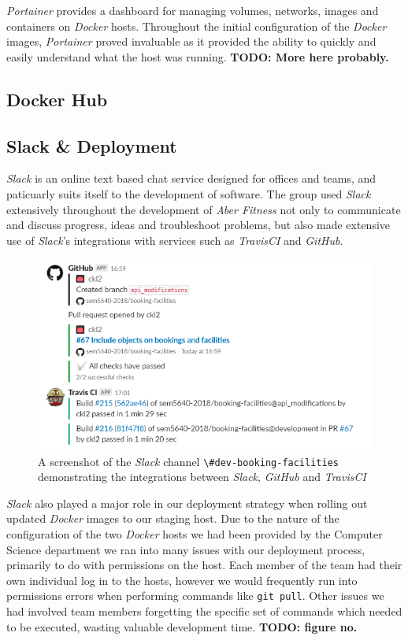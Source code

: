 \textit{Portainer} provides a dashboard for managing volumes, networks, images and containers on \textit{Docker} hosts. Throughout the initial configuration of the \textit{Docker} images, \textit{Portainer} proved invaluable as it provided the ability to quickly and easily understand what the host was running. \textbf{TODO: More here probably.}

\subsection{Docker Hub}


\subsection{Slack \& Deployment}
\textit{Slack} is an online text based chat service designed for offices and teams, and paticuarly suits itself to the development of software. The group used \textit{Slack} extensively throughout the development of \textit{Aber Fitness} not only to communicate and discuss progress, ideas and troubleshoot problems, but also made extensive use of \textit{Slack}'s integrations with services such as \textit{TravisCI} and \textit{GitHub}. 

\begin{figure}[H]
    \centering
    \includegraphics[width=\textwidth]{Images/Slack_Travis_GitHub.png}
    \caption{A screenshot of the \textit{Slack} channel \lstinline{\#dev-booking-facilities} demonstrating the integrations between \textit{Slack}, \textit{GitHub} and \textit{TravisCI}}
\end{figure}

\textit{Slack} also played a major role in our deployment strategy when rolling out updated \textit{Docker} images to our staging host. Due to the nature of the configuration of the two \textit{Docker} hosts we had been provided by the Computer Science department we ran into many issues with our deployment process, primarily to do with permissions on the host. Each member of the team had their own individual log in to the hosts, however we would frequently run into permissions errors when performing commands like \lstinline{git pull}. Other issues we had involved team members forgetting the specific set of commands which needed to be executed, wasting valuable development time. \textbf{TODO: figure no.}

